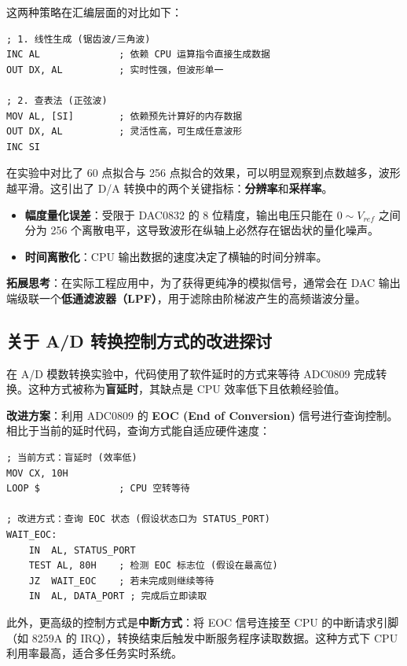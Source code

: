 \documentclass[UTF8]{article}
\begin{document}
    这两种策略在汇编层面的对比如下：

\begin{lstlisting}[language={[x86masm]Assembler}]
; 1. 线性生成 (锯齿波/三角波)
INC AL              ; 依赖 CPU 运算指令直接生成数据
OUT DX, AL          ; 实时性强，但波形单一

; 2. 查表法 (正弦波)
MOV AL, [SI]        ; 依赖预先计算好的内存数据
OUT DX, AL          ; 灵活性高，可生成任意波形
INC SI
\end{lstlisting}

    在实验中对比了 60 点拟合与 256 点拟合的效果，可以明显观察到点数越多，波形越平滑。这引出了 D/A 转换中的两个关键指标：\textbf{分辨率}和\textbf{采样率}。
    \begin{itemize}
        \item \textbf{幅度量化误差}：受限于 DAC0832 的 8 位精度，输出电压只能在 $0 \sim V_{ref}$ 之间分为 256 个离散电平，这导致波形在纵轴上必然存在锯齿状的量化噪声。
        \item \textbf{时间离散化}：CPU 输出数据的速度决定了横轴的时间分辨率。
    \end{itemize}
    \textbf{拓展思考}：在实际工程应用中，为了获得更纯净的模拟信号，通常会在 DAC 输出端级联一个\textbf{低通滤波器（LPF）}，用于滤除由阶梯波产生的高频谐波分量。

\subsection{关于 A/D 转换控制方式的改进探讨}
    在 A/D 模数转换实验中，代码使用了软件延时的方式来等待 ADC0809 完成转换。这种方式被称为\textbf{盲延时}，其缺点是 CPU 效率低下且依赖经验值。
    
    \textbf{改进方案}：利用 ADC0809 的 \textbf{EOC (End of Conversion)} 信号进行查询控制。相比于当前的延时代码，查询方式能自适应硬件速度：

\begin{lstlisting}[language={[x86masm]Assembler}]
; 当前方式：盲延时 (效率低)
MOV CX, 10H
LOOP $              ; CPU 空转等待

; 改进方式：查询 EOC 状态 (假设状态口为 STATUS_PORT)
WAIT_EOC:
    IN  AL, STATUS_PORT
    TEST AL, 80H    ; 检测 EOC 标志位 (假设在最高位)
    JZ  WAIT_EOC    ; 若未完成则继续等待
    IN  AL, DATA_PORT ; 完成后立即读取
\end{lstlisting}

    此外，更高级的控制方式是\textbf{中断方式}：将 EOC 信号连接至 CPU 的中断请求引脚（如 8259A 的 IRQ），转换结束后触发中断服务程序读取数据。这种方式下 CPU 利用率最高，适合多任务实时系统。
\end{document}

